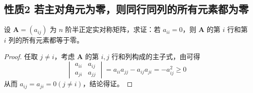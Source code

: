\documentclass[../../main.tex]{subfiles}
\begin{document}
\subsection{性质2 若主对角元为零，则同行同列的所有元素都为零}

\begin{proposition}\label{proposition:若主对角元为零，则同行同列的所有元素都为零}
设 \(\boldsymbol{A}=(a_{ij})\) 为 \(n\) 阶半正定实对称矩阵，求证：若 \(a_{ii}=0\)，则 \(\boldsymbol{A}\) 的第 \(i\) 行和第 \(i\) 列的所有元素都等于零。
\end{proposition}
\begin{proof}
任取 \(j\neq i\)，考虑 \(\boldsymbol{A}\) 的第 \(i,j\) 行和列构成的主子式，由可得
\[
\begin{vmatrix}
a_{ii}&a_{ij}\\
a_{ji}&a_{jj}
\end{vmatrix}=a_{ii}a_{jj}-a_{ij}a_{ji}=-a_{ij}^2\geq0
\]
从而 \(a_{ij}=a_{ji}=0(j\neq i)\)，结论得证。
\end{proof}
\end{document}
